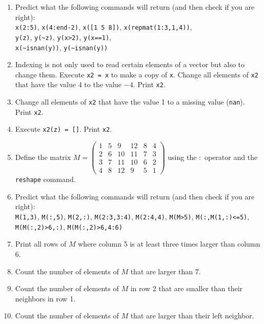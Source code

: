 \begin{enumerate}
\item
Predict what the following commands will return (and then check if you are right):
\\
\texttt{x{(2:5)}}, \texttt{x{(4:end-2)}}, \texttt{x{([1 5 8])}}, \texttt{x{(repmat{(1:3,1,4)})}},
\\
\texttt{y{(z)}}, \texttt{y{(\textasciitilde{z})}}, \texttt{y{(x>2)}}, \texttt{y{(x==1)}},
\\
\texttt{x{(\textasciitilde{isnan{(y)}})}}, \texttt{y{(\textasciitilde{isnan{(y)}})}}

\item
Indexing is not only used to read certain elements of a vector but also to change them.
Execute \texttt{x2 = x} to make a copy of \texttt{x}.
Change all elements of \texttt{x2} that have the value \(4\) to the value \(-4\).
Print \texttt{x2}.

\item
Change all elements of \texttt{x2} that have the value 1 to a missing value (\texttt{nan}).
Print \texttt{x2}.

\item
Execute \texttt{x2(z) = []}. Print \texttt{x2}.

\item
Define the matrix
\(M = \begin{pmatrix}
1 & 5 &  9 & 12 & 8 & 4\\
2 & 6 & 10 & 11 & 7 & 3\\
3 & 7 & 11 & 10 & 6 & 2\\
4 & 8 & 12 &  9 & 5 & 1
\end{pmatrix}\)
using the \({:}\) operator and the \texttt{reshape} command.

\item
Predict what the following commands will return (and then check if you are right):
\\
\texttt{M{(1,3)}}, \texttt{M{(:,5)}}, \texttt{M{(2,:)}}, \texttt{M{(2:3,3:4)}}, \texttt{M{(2:4,4)}},
\texttt{M{(M>5)}}, \texttt{M{(:,M{(1,:)}<=5)}}, \texttt{M{(M{(:,2)}>6,:)}}, \texttt{M{(M{(:,2)}>6,4:6)}}

\item
Print all rows of \(M\) where column 5 is at least three times larger than column 6.

\item
Count the number of elements of \(M\) that are larger than 7.

\item
Count the number of elements of \(M\) in row 2 that are smaller than their neighbors in row 1.

\item
Count the number of elements of \(M\) that are larger than their left neighbor.

\end{enumerate}


